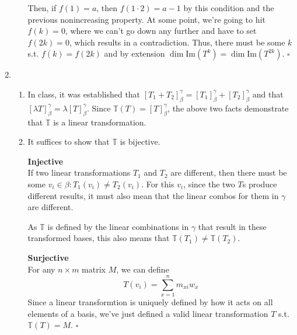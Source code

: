 \documentclass[12pt]{article}
\begin{document}
\begin{enumerate}
\begin{enumerate}
                        Then, if $f(1)=a$, then $f(1 \cdot 2)=a-1$ by this condition and the previous nonincreasing property.
                        At some point, we're going to hit $f(k)=0$, where we can't go down any further and have to set $f(2k)=0$, which results in a contradiction.
                        Thus, there must be some $k$ s.t. $f(k)=f(2k)$ and by extension $\dim \text{Im}(T^k)=\dim \text{Im}(T^{2k})$. $\square$
            \end{enumerate}
      \item \begin{enumerate}
                  \item In class, it was established that $[T_1+T_2]^\gamma_\beta=[T_1]^\gamma_\beta+[T_2]^\gamma_\beta$ and that
                        $[\lambda T]^\gamma_\beta = \lambda [T]^\gamma_\beta$.
                        Since $\mathbb{T}(T)=[T]^\gamma_\beta$, the above two facts demonstrate that $\mathbb{T}$ is a linear transformation.

                  \item It suffices to show that $\mathbb{T}$ is bijective.

                        \textbf{Injective} \\
                        If two linear transformations $T_1$ and $T_2$ are different, then there must be some $v_i \in \beta: T_1(v_i) \ne T_2(v_i)$.
                        For this $v_i$, since the two $T$s produce different results, it must also mean that the linear combos for them in $\gamma$ are different.

                        As $\mathbb{T}$ is defined by the linear combinations in $\gamma$ that result in these transformed bases,
                        this also means that $\mathbb{T}(T_1) \ne \mathbb{T}(T_2)$.

                        \textbf{Surjective} \\
                        For any $n \times m$ matrix $M$, we can define \[T(v_i)=\sum_{x=1}^{n} m_{xi}w_x\]
                        Since a linear transformtion is uniquely defined by how it acts on all elements of a basis,
                        we've just defined a valid linear transformation $T$ s.t. $\mathbb{T}(T)=M$. $\square$
            \end{enumerate}
\end{enumerate}
\end{document}

